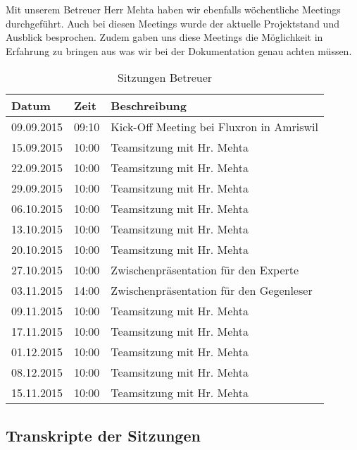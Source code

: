 Mit unserem Betreuer Herr Mehta haben wir ebenfalls wöchentliche Meetings durchgeführt. Auch bei diesen Meetings wurde der aktuelle Projektstand und Ausblick besprochen. Zudem gaben uns diese Meetings die Möglichkeit in Erfahrung zu bringen aus was wir bei der Dokumentation genau achten müssen.

\begin{table}[H]
\begin{tabularx}{\textwidth}{ l | l | X}
\textbf{Datum}& \textbf{Zeit} & \textbf{Beschreibung}\\ \hline
09.09.2015 & 09:10 & Kick-Off Meeting bei Fluxron in Amriswil\\ \hline
15.09.2015 & 10:00 & Teamsitzung mit Hr. Mehta\\ \hline
22.09.2015 & 10:00 & Teamsitzung mit Hr. Mehta\\ \hline
29.09.2015 & 10:00 & Teamsitzung mit Hr. Mehta\\ \hline
06.10.2015 & 10:00 & Teamsitzung mit Hr. Mehta\\ \hline
13.10.2015 & 10:00 & Teamsitzung mit Hr. Mehta\\ \hline
20.10.2015 & 10:00 & Teamsitzung mit Hr. Mehta\\ \hline
27.10.2015 & 10:00 & Zwischenpräsentation für den Experte\\ \hline
03.11.2015 & 14:00 & Zwischenpräsentation für den Gegenleser\\ \hline
09.11.2015 & 10:00 & Teamsitzung mit Hr. Mehta\\ \hline
17.11.2015 & 10:00 & Teamsitzung mit Hr. Mehta\\ \hline
01.12.2015 & 10:00 & Teamsitzung mit Hr. Mehta\\ \hline
08.12.2015 & 10:00 & Teamsitzung mit Hr. Mehta\\ \hline
15.11.2015 & 10:00 & Teamsitzung mit Hr. Mehta\\ \hline
\end{tabularx}
\caption{Sitzungen Betreuer}
\end{table}

\subsection{Transkripte der Sitzungen}
\label{sub:sitzungs_transkripte}

